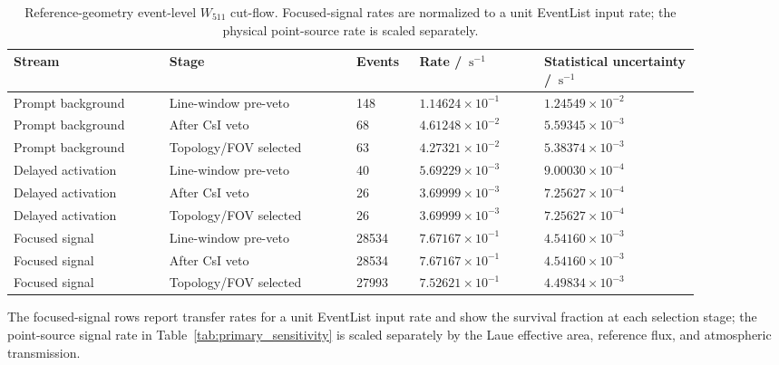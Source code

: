 \documentclass[11pt]{article}
\newcommand{\cps}{\ensuremath{\,\mathrm{s^{-1}}}}
\newcommand{\wii}{W_{511}}
\begin{document}
\begin{table}[t]
\centering
\caption{Reference-geometry event-level $\wii$ cut-flow. Focused-signal rates are normalized to a unit EventList input rate; the physical point-source rate is scaled separately.}
\label{tab:phase2_cutflow}
\footnotesize
{
\setlength{\tabcolsep}{3pt}
\begin{tabular}{p{0.20\linewidth}p{0.24\linewidth}p{0.08\linewidth}p{0.16\linewidth}p{0.20\linewidth}}
\toprule
Stream & Stage & Events & Rate / $\cps$ & Statistical uncertainty / $\cps$ \\
\midrule
Prompt background & Line-window pre-veto & 148 & $1.14624\times10^{-1}$ & $1.24549\times10^{-2}$ \\
Prompt background & After CsI veto & 68 & $4.61248\times10^{-2}$ & $5.59345\times10^{-3}$ \\
Prompt background & Topology/FOV selected & 63 & $4.27321\times10^{-2}$ & $5.38374\times10^{-3}$ \\
Delayed activation & Line-window pre-veto & 40 & $5.69229\times10^{-3}$ & $9.00030\times10^{-4}$ \\
Delayed activation & After CsI veto & 26 & $3.69999\times10^{-3}$ & $7.25627\times10^{-4}$ \\
Delayed activation & Topology/FOV selected & 26 & $3.69999\times10^{-3}$ & $7.25627\times10^{-4}$ \\
Focused signal & Line-window pre-veto & 28534 & $7.67167\times10^{-1}$ & $4.54160\times10^{-3}$ \\
Focused signal & After CsI veto & 28534 & $7.67167\times10^{-1}$ & $4.54160\times10^{-3}$ \\
Focused signal & Topology/FOV selected & 27993 & $7.52621\times10^{-1}$ & $4.49834\times10^{-3}$ \\
\bottomrule
\end{tabular}
\par}
\vspace{0.5ex}
\begin{minipage}{0.94\linewidth}
\footnotesize
The focused-signal rows report transfer rates for a unit EventList input rate
and show the survival fraction at each selection stage; the point-source signal rate in Table~\ref{tab:primary_sensitivity}
is scaled separately by the Laue effective area, reference flux, and atmospheric
transmission.
\end{minipage}
\end{table}
\end{document}
